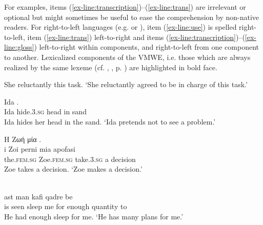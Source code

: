 \documentclass[output=paper,modfonts,]{langscibook}
\begin{document}
For  examples, items (\ref{ex-line:transcription})--(\ref{ex-line:trans}) are irrelevant or optional but  might sometimes be useful to ease the comprehension by non-native readers. For right-to-left languages (e.g.  or ), item (\ref{ex-line:use}) is spelled right-to-left, item (\ref{ex-line:trans}) left-to-right and items (\ref{ex-line:transcription})--(\ref{ex-line:gloss}) left-to-right within components, and right-to-left from one component to another. 
Lexicalized components of the VMWE, i.e. those which are always realized by the same lexeme %
(cf. , , p. \pageref{sec:def-scope}) 
are highlighted in bold face. 



\ea\label{preface:en:take-on}
\settowidth {} 
She reluctantly   this task. 
\glt `She reluctantly agreed to be in charge of this task.'
\z

\ea \label{preface:sl:skrivati-glavo-v-pesek}
\settowidth {} 
\gll Ida    . \\
Ida hide.\textsc{3.sg} head in sand \\ 
\glt Ida hides her head in the sand. `Ida pretends not to see a problem.’
\z

\ea \label{preface:el:take-decision}
\settowidth {} 
\glll Η Ζωή  μία . \\
i Zoi perni mia apofasi \\
the\textsc{.fem.sg} Zoe\textsc{.fem.sg} take.\textsc{3.sg} a decision \\ 
\glt Zoe takes a decision. `Zoe makes a decision.'
\z

\ea \label{preface:fa:have-sleep-for-sb}
\settowidth {} 
\glll {}        \\
ast   man  kafi qadre be  \\
is seen sleep me for enough quantity to\\ 
\glt He had enough sleep for me. `He has many plans for me.’
\z
\end{document}
